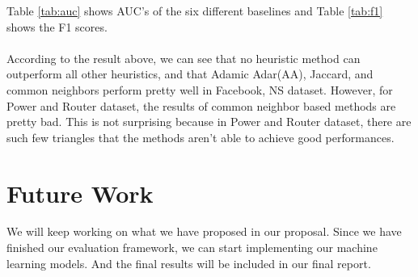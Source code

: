 \documentclass[12pt]{article}
\begin{document}
Table \ref{tab:auc} shows AUC's of the six different baselines and Table \ref{tab:f1} shows the F1 scores.
\\
\\
According to the result above, we can see that no heuristic method can outperform all other heuristics, and that Adamic Adar(AA), Jaccard, and common neighbors perform pretty well in Facebook, NS dataset. However, for Power and Router dataset, the results of common neighbor based methods are pretty bad. This is not surprising because in Power and Router dataset, there are such few triangles that the methods aren't able to achieve good performances. 

\section{Future Work}
We will keep working on what we have proposed in our proposal. Since we have finished our evaluation framework, we can start implementing our machine learning models. And the final results will be included in our final report. 





\end{document}
